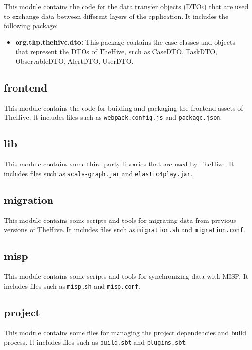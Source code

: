 \documentclass{article}
\begin{document}
This module contains the code for the data transfer objects (DTOs) that are used to exchange data between different layers of the application. It includes the following package:

\begin{itemize}
    \item \textbf{org.thp.thehive.dto:} This package contains the case classes and objects that represent the DTOs of TheHive, such as CaseDTO, TaskDTO, ObservableDTO, AlertDTO, UserDTO.
\end{itemize}

\subsection{frontend}

This module contains the code for building and packaging the frontend assets of TheHive. It includes files such as \texttt{webpack.config.js} and \texttt{package.json}.

\subsection{lib}

This module contains some third-party libraries that are used by TheHive. It includes files such as \texttt{scala-graph.jar} and \texttt{elastic4play.jar}.

\subsection{migration}

This module contains some scripts and tools for migrating data from previous versions of TheHive. It includes files such as \texttt{migration.sh} and \texttt{migration.conf}.

\subsection{misp}

This module contains some scripts and tools for synchronizing data with MISP. It includes files such as \texttt{misp.sh} and \texttt{misp.conf}.

\subsection{project}

This module contains some files for managing the project dependencies and build process. It includes files such as \texttt{build.sbt} and \texttt{plugins.sbt}.
\end{document}
